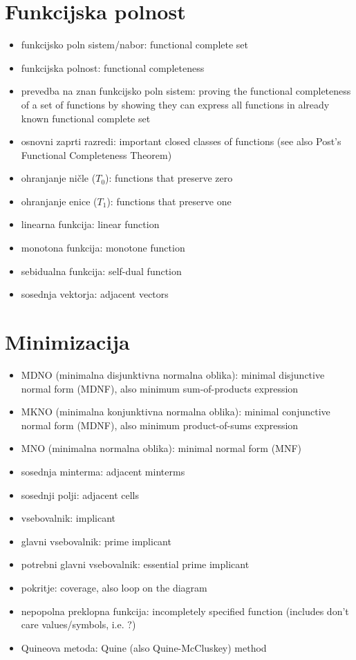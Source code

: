 \section*{Funkcijska polnost}

\begin{itemize}
\item funkcijsko poln sistem/nabor: functional complete set
\item funkcijska polnost: functional completeness
\item prevedba na znan funkcijsko poln sistem: proving the functional completeness of a set of functions by showing they can express all functions in already known functional complete set
\item osnovni zaprti razredi: important closed classes of functions (see also Post's Functional Completeness Theorem)
\item ohranjanje ničle ($T_0$): functions that preserve zero
\item ohranjanje enice ($T_1$): functions that preserve one
\item linearna funkcija: linear function
\item monotona funkcija: monotone function
\item sebidualna funkcija: self-dual function
\item sosednja vektorja: adjacent vectors
\end{itemize}

\section*{Minimizacija}

\begin{itemize}
\item MDNO (minimalna disjunktivna normalna oblika): minimal disjunctive normal form (MDNF), also minimum sum-of-products expression
\item MKNO (minimalna konjunktivna normalna oblika): minimal conjunctive normal form (MDNF), also minimum product-of-sums expression
\item MNO (minimalna normalna oblika): minimal normal form (MNF)
\item sosednja minterma: adjacent minterms
\item sosednji polji: adjacent cells
\item vsebovalnik: implicant
\item glavni vsebovalnik: prime implicant
\item potrebni glavni vsebovalnik: essential prime implicant
\item pokritje: coverage, also loop on the diagram
\item nepopolna preklopna funkcija: incompletely specified function (includes don't care values/symbols, i.e. $?$)
\item Quineova metoda: Quine (also Quine-McCluskey) method
\end{itemize}

